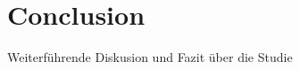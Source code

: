 
\chapter{Conclusion} %

\label{Conclusion} %
\begin{text}
Weiterführende Diskusion und Fazit über die Studie
\end{text}